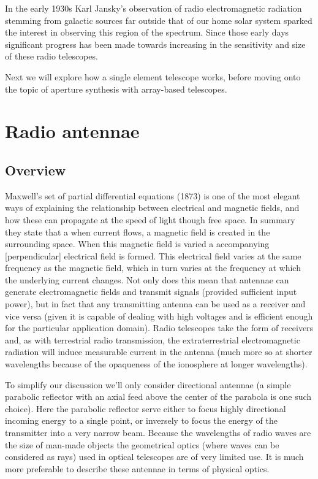 In the early 1930s Karl Jansky's observation of radio electromagnetic radiation stemming from galactic sources far outside that of our home solar system sparked the interest in observing this region of 
the spectrum. Since those early days significant progress has been made towards increasing in the sensitivity and size of these radio telescopes. 

Next we will explore how a single element telescope works, before moving onto the topic of aperture synthesis with array-based telescopes.

\section{Radio antennae}
\subsection{Overview}
Maxwell's set of partial differential equations (1873) is one of the most elegant ways of explaining the relationship between electrical and magnetic fields, and how these can propagate at the speed of light 
though free space. In summary they state that a when current flows, a magnetic field is created in the surrounding space. When this magnetic field is varied a accompanying [perpendicular] electrical field is formed. This electrical field 
varies at the same frequency as the magnetic field, which in turn varies at the frequency at which the underlying current changes. Not only does this mean that antennae can generate electromagnetic fields and transmit signals (provided
sufficient input power), but in fact that any transmitting antenna can be used as a receiver and vice versa (given it is capable of dealing with high voltages and is efficient enough for the particular application domain). Radio telescopes 
take the form of receivers and, as with terrestrial radio transmission, the extraterrestrial electromagnetic radiation will induce measurable current in the antenna (much more so at shorter wavelengths 
because of the opaqueness of the ionosphere at longer wavelengths).

To simplify our discussion we'll only consider directional antennae (a simple parabolic reflector with an axial feed above the center of the parabola is 
one such choice). Here the parabolic reflector serve either to focus highly directional incoming energy to a single point, or inversely to 
focus the energy of the transmitter into a very narrow beam. Because the wavelengths of radio waves are the size of man-made objects the geometrical optics 
(where waves can be considered as rays) used in optical telescopes are of very limited use. It is much more preferable to describe these antennae in terms of 
physical optics.

